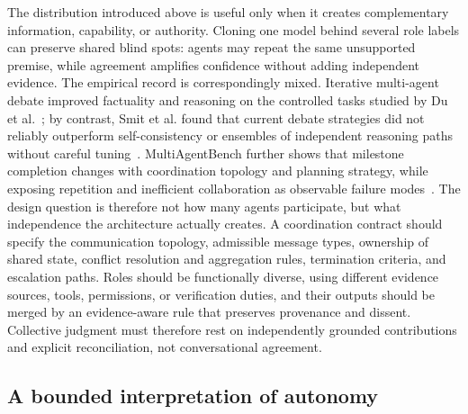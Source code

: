 The distribution introduced above is useful only when it creates complementary information, capability, or authority. Cloning one model behind several role labels can preserve shared blind spots: agents may repeat the same unsupported premise, while agreement amplifies confidence without adding independent evidence. The empirical record is correspondingly mixed. Iterative multi-agent debate improved factuality and reasoning on the controlled tasks studied by Du et al.~\cite{du2024multiagentdebate}; by contrast, Smit et al. found that current debate strategies did not reliably outperform self-consistency or ensembles of independent reasoning paths without careful tuning~\cite{smit2024mad}. MultiAgentBench further shows that milestone completion changes with coordination topology and planning strategy, while exposing repetition and inefficient collaboration as observable failure modes~\cite{zhu2025multiagentbench}. The design question is therefore not how many agents participate, but what independence the architecture actually creates. A coordination contract should specify the communication topology, admissible message types, ownership of shared state, conflict resolution and aggregation rules, termination criteria, and escalation paths. Roles should be functionally diverse, using different evidence sources, tools, permissions, or verification duties, and their outputs should be merged by an evidence-aware rule that preserves provenance and dissent. Collective judgment must therefore rest on independently grounded contributions and explicit reconciliation, not conversational agreement.

\subsection{A bounded interpretation of autonomy}

